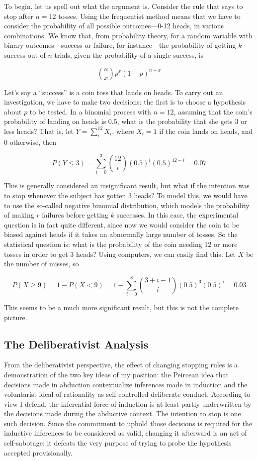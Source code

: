 To begin, let us spell out what the argument is. Consider the rule that says to stop after \(n=12\) tosses. Using the frequentist method means that we have to consider the probability of all
possible outcomes---0-12 heads, in various combinations.  We know that, from probability theory, for a random
variable with binary outcomes---success or failure, for instance---the
probability of getting \(k\) success out of \(n\) trials, given the
probability of a single success, is

\[{n \choose x} p^x (1-p)^{n-x}\]

Let's say a ``success'' is a coin toss that lands on heads. To carry out
an investigation, we have to make two decisions: the first is to choose
a hypothesis about \(p\) to be tested. In a binomial process with
\(n=12\), assuming that the coin's probability of landing on heads is
\(0.5\), what is the probability that she gets 3 or less heads? That is,
let \(Y=\sum_i^{12} X_i\), where \(X_i = 1\) if the coin lands on heads,
and 0 otherwise, then

\[P(Y \leq 3 ) =  \sum_{i=0}^{3} {12 \choose i} (0.5)^i (0.5)^{12-i} = 0.07\]

This is generally considered an insignificant result, but what if the
intention was to stop whenever the subject has gotten 3 heads? To model
this, we would have to use the so-called negative binomial distribution,
which models the probability of making \(r\) failures before getting \(k\)
successes. In this case, the experimental question is in fact quite
different, since now we would consider the coin to be biased against
heads if it takes an abnormally large number of tosses. So the
statistical question is: what is the probability of the coin needing
\(12\) or more tosses in order to get 3 heads? Using computers, we can
easily find this. Let \(X\) be the number of misses, so

\[P(X \geq 9) = 1 - P(X <9) = 1 - \sum_{i=0}^{8} {3+i-1 \choose i} (0.5)^3 (0.5)^{i} =0.03\]

This seems to be a much more significant result, but this is not the
complete picture. 

\subsection{The Deliberativist Analysis}

From the deliberativist perspective, the effect of changing stopping rules is a demonstration of the two key ideas of my position: the Peircean idea that decisions made in abduction contextualize inferences made in induction and the voluntarist ideal of rationality as self-controlled deliberate conduct. According to view I defend, the inferential force of induction is at least partly underwritten by the decisions made during the abductive context. The intention to stop is one such decision. Since the commitment to uphold those decisions is required for the inductive inferences to be considered as valid, changing it afterward is an act of self-sabotage: it defeats the very purpose of trying to probe the hypothesis accepted provisionally. 


